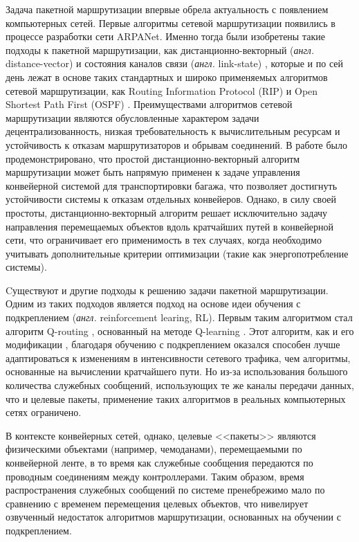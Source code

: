 \documentclass[specification,annotation,times]{itmo-student-thesis}
\theoremstyle{definition}
\begin{document}
Задача пакетной маршрутизации впервые обрела актуальность с появлением
компьютерных сетей. Первые алгоритмы сетевой маршрутизации появились в процессе
разработки сети ARPANet. Именно тогда были изобретены такие подходы к пакетной
маршрутизации, как дистанционно-векторный (\textit{англ.} distance-vector)
\cite{arpanet-orig} и состояния каналов связи (\textit{англ.} link-state)
\cite{link-state-arpanet}, которые и по сей день лежат в основе
таких стандартных и широко применяемых алгоритмов сетевой маршрутизации, как
Routing Information Protocol (RIP) \cite{rip-rfc} и Open Shortest Path First
(OSPF) \cite{ospf-rfc}. Преимуществами алгоритмов сетевой маршрутизации являются
обусловленные характером задачи децентрализованность, низкая требовательность к
вычислительным ресурсам и устойчивость к отказам маршрутизаторов и обрывам
соединений. В работе \cite{vyatkin-controllers} было продемонстрировано, что
простой дистанционно-векторный алгоритм маршрутизации может быть напрямую
применен к задаче управления конвейерной системой для транспортировки багажа,
что позволяет достигнуть устойчивости системы к отказам отдельных конвейеров.
Однако, в силу своей простоты, дистанционно-векторный алгоритм решает
исключительно задачу направления перемещаемых объектов вдоль кратчайших путей в
конвейерной сети, что ограничивает его применимость в тех случаях, когда
необходимо учитывать дополнительные критерии оптимизации (такие как
энергопотребление системы).

Cуществуют и другие подходы к решению задачи пакетной маршрутизации. Одним из
таких подходов является подход на основе идеи обучения с подкреплением
(\textit{англ.} reinforcement learing, RL). Первым таким алгоритмом стал алгоритм
Q-routing \cite{q-routing-orig}, основанный на методе Q-learning
\cite{q-learning-orig}. Этот алгоритм, как и его модификации
\cite{predictive-q-routing, dual-q-routing}, благодаря обучению с подкреплением
оказался способен лучше адаптироваться к изменениям в интенсивности сетевого
трафика, чем алгоритмы, основанные на вычислении кратчайшего пути. Но из-за
использования большого количества служебных сообщений, использующих те же каналы
передачи данных, что и целевые пакеты, применение таких алгоритмов в реальных
компьютерных сетях ограничено.

В контексте конвейерных сетей, однако, целевые <<пакеты>> являются физическими
объектами (например, чемоданами), перемещаемыми по конвейерной ленте, в то время
как служебные сообщения передаются по проводным соединениям между контроллерами.
Таким образом, время распространения служебных сообщений по системе пренебрежимо
мало по сравнению с временем перемещения целевых объектов, что нивелирует
озвученный недостаток алгоритмов маршрутизации, основанных на обучении с
подкреплением.
\end{document}
